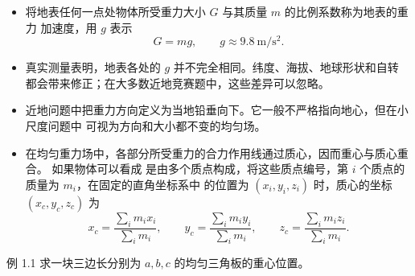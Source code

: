 \documentclass[UTF8,zihao=-4,oneside,openany]{ctexbook}
\begin{document}
\begin{itemize}
  \item 将地表任何一点处物体所受重力大小 $G$ 与其质量 $m$ 的比例系数称为地表的重力
  加速度，用 $g$ 表示
  \begin{equation}
    G=mg,\qquad g\approx\SI{9.8}{\metre\per\second\squared}.
  \end{equation}

  \item 真实测量表明，地表各处的 $g$ 并不完全相同。纬度、海拔、地球形状和自转
  都会带来修正；在大多数近地竞赛题中，这些差异可以忽略。

  \item 近地问题中把重力方向定义为当地铅垂向下。它一般不严格指向地心，但在小尺度问题中
  可视为方向和大小都不变的均匀场。

  \item 在均匀重力场中，各部分所受重力的合力作用线通过质心，因而重心与质心重合。
  如果物体可以看成
  是由多个质点构成，将这些质点编号，第 $i$ 个质点的质量为 $m_i$，在固定的直角坐标系中
  的位置为 $(x_i,y_i,z_i)$ 时，质心的坐标 $(x_c,y_c,z_c)$ 为
  \begin{equation}
    x_c=\frac{\sum_i m_ix_i}{\sum_i m_i},\qquad
    y_c=\frac{\sum_i m_iy_i}{\sum_i m_i},\qquad
    z_c=\frac{\sum_i m_iz_i}{\sum_i m_i}.
  \end{equation}
\end{itemize}

\begin{origexamplebox}{例 1.1}
求一块三边长分别为 $a,b,c$ 的均匀三角板的重心位置。

\begin{center}
\end{center}
\end{origexamplebox}
\end{document}
